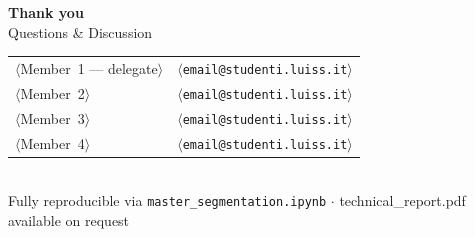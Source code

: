 \documentclass[aspectratio=169,10pt]{beamer}
\begin{document}
\begin{frame}[plain]
\centering\vspace{1.5cm}
{\LARGE\color{navy}\textbf{Thank you}}\\[0.6em]
{\large\color{navy!70} Questions \& Discussion}\\[1.4em]
{\small
  \begin{tabular}{ll}
    $\langle$Member~1 --- delegate$\rangle$ & \texttt{$\langle$email@studenti.luiss.it$\rangle$} \\
    $\langle$Member~2$\rangle$ & \texttt{$\langle$email@studenti.luiss.it$\rangle$} \\
    $\langle$Member~3$\rangle$ & \texttt{$\langle$email@studenti.luiss.it$\rangle$} \\
    $\langle$Member~4$\rangle$ & \texttt{$\langle$email@studenti.luiss.it$\rangle$} \\
  \end{tabular}
}\\[1.2em]
{\footnotesize Fully reproducible via \texttt{master\_segmentation.ipynb} $\cdot$
  technical\_report.pdf available on request}
\end{frame}
\end{document}
